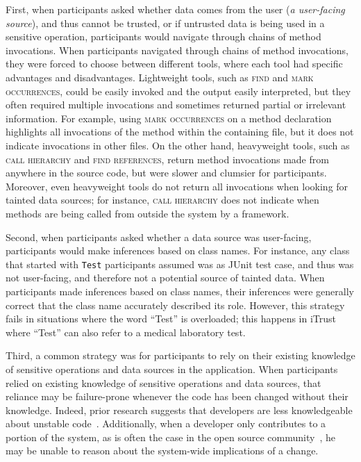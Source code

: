 \documentclass{acm_proc_article-sp}
\begin{document}
First, when participants asked whether data comes from the user (\emph{a user-facing source}), 
and thus cannot be trusted, or if untrusted data is being used in a sensitive operation,
participants would navigate through chains of method invocations.
When participants navigated through chains of method invocations,
they were forced to choose between different tools, where each tool
had specific advantages and disadvantages.
Lightweight tools, such as \textsc{find} and \textsc{mark occurrences}, could be easily invoked and the output
easily interpreted, but they often required multiple invocations and sometimes returned 
partial or irrelevant information.
For example, using \textsc{mark occurrences} on a method declaration highlights all invocations of the method 
within the containing file, but it does not indicate invocations in other files.
On the other hand, heavyweight tools, such as \textsc{call hierarchy} and \textsc{find references}, 
return method invocations made from anywhere in the source code, but were slower and clumsier for participants.
Moreover, even heavyweight tools do not return all invocations when looking for tainted data sources;
for instance, \textsc{call hierarchy} does not indicate when methods are being called from outside the system
by a framework.

Second, when participants asked whether a data source was user-facing,
participants would make inferences based on class names.
For instance, any class that started with \texttt{Test} participants assumed was as JUnit test case,
and thus was not user-facing, and therefore not a potential source of tainted data.
When participants made inferences based on class names,
their inferences were generally correct that the class name accurately described
its role.
However, this strategy
fails in situations where the word ``Test'' is overloaded;
this happens in iTrust where ``Test'' can also refer to 
a medical laboratory test.

Third, a common strategy was for
participants to rely on their existing knowledge of sensitive operations and data sources in the application.
When participants relied on existing knowledge of sensitive operations and data sources,
that reliance may be failure-prone whenever the code has been changed without their knowledge.
Indeed, prior research suggests that developers are 
less knowledgeable about unstable code~\cite{fritz2014degree}. 
Additionally, when a developer only contributes to a portion of the system, as is often the case in the open source community~\cite{mockus2002open}, he may be unable to reason about the system-wide implications of a change. 
\end{document}
